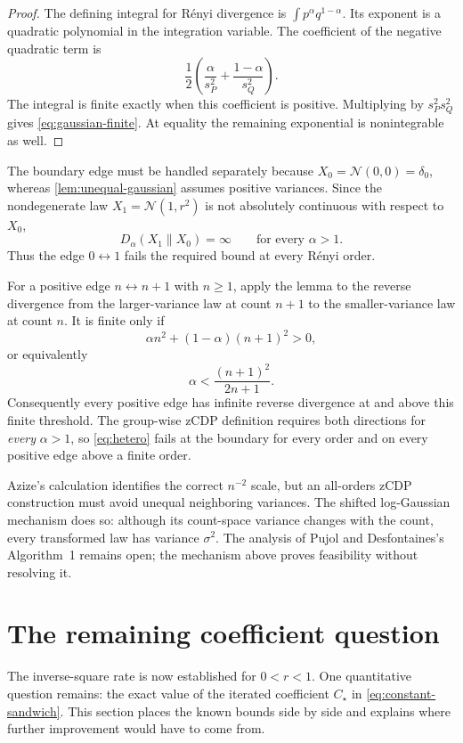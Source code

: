 \documentclass[11pt]{article}
\newcommand{\N}{\mathcal{N}}
\newcommand{\Dalpha}{D_{\alpha}}
\theoremstyle{definition}
\begin{document}
\begin{proof}
The defining integral for R\'enyi divergence is $\int p^\alpha q^{1-\alpha}$. Its exponent is a quadratic polynomial in the integration variable. The coefficient of the negative quadratic term is
\[
  \frac12\left(\frac{\alpha}{s_P^2}
               +\frac{1-\alpha}{s_Q^2}\right).
\]
The integral is finite exactly when this coefficient is positive. Multiplying by $s_P^2s_Q^2$ gives \eqref{eq:gaussian-finite}. At equality the remaining exponential is nonintegrable as well.
\end{proof}

The boundary edge must be handled separately because $X_0=\N(0,0)=\delta_0$, whereas \cref{lem:unequal-gaussian} assumes positive variances. Since the nondegenerate law $X_1=\N(1,r^2)$ is not absolutely continuous with respect to $X_0$,
\[
  \Dalpha(X_1\|X_0)=\infty
  \qquad\text{for every }\alpha>1.
\]
Thus the edge $0\leftrightarrow1$ fails the required bound at every R\'enyi order.

For a positive edge $n\leftrightarrow n+1$ with $n\ge1$, apply the lemma to the reverse divergence from the larger-variance law at count $n+1$ to the smaller-variance law at count $n$. It is finite only if
\[
  \alpha n^2+(1-\alpha)(n+1)^2>0,
\]
or equivalently
\begin{equation}
  \alpha<\frac{(n+1)^2}{2n+1}.
  \label{eq:alpha-threshold}
\end{equation}
Consequently every positive edge has infinite reverse divergence at and above this finite threshold. The group-wise zCDP definition requires both directions for \emph{every} $\alpha>1$, so \eqref{eq:hetero} fails at the boundary for every order and on every positive edge above a finite order.

Azize's calculation identifies the correct $n^{-2}$ scale, but an all-orders zCDP construction must avoid unequal neighboring variances. The shifted log-Gaussian mechanism does so: although its count-space variance changes with the count, every transformed law has variance $\sigma^2$. The analysis of Pujol and Desfontaines's Algorithm~1 remains open; the mechanism above proves feasibility without resolving it.

\section{The remaining coefficient question}
\label{sec:discussion}

The inverse-square rate is now established for $0<r<1$. One quantitative question remains: the exact value of the iterated coefficient $C_\star$ in \eqref{eq:constant-sandwich}. This section places the known bounds side by side and explains where further improvement would have to come from.
\end{document}
